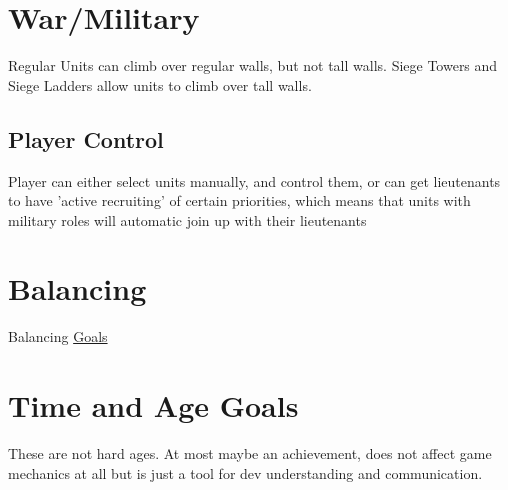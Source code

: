 \documentclass[11pt]{article}
\begin{document}
\section{War/Military}
\label{sec:org19171ff}
Regular Units can climb over regular walls, but not tall walls. Siege Towers and Siege Ladders allow units to climb over tall walls.\\
\subsection{Player Control}
\label{sec:org2021b81}
Player can either select units manually, and control them, or can get lieutenants to have 'active recruiting' of certain priorities, which means that units with military roles will automatic join up with their lieutenants\\
\section{Balancing}
\label{sec:orgd29f19a}
Balancing \hyperref[org55b3b0b]{Goals}\\
\section{Time and Age Goals}
\label{sec:org58f7442}
These are not hard ages. At most maybe an achievement, does not affect game mechanics at all but is just a tool for dev understanding and communication.\\
\end{document}
